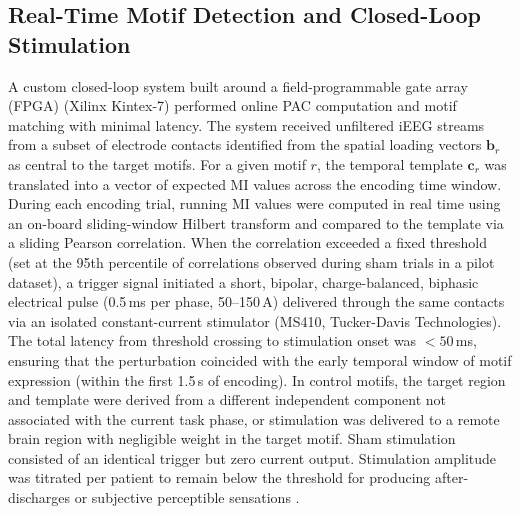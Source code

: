 \documentclass{article}
\begin{document}
\subsection{Real-Time Motif Detection and Closed-Loop Stimulation}
A custom closed-loop system built around a field-programmable gate array (FPGA) (Xilinx Kintex-7) performed online PAC computation and motif matching with minimal latency. The system received unfiltered iEEG streams from a subset of electrode contacts identified from the spatial loading vectors \(\mathbf{b}_r\) as central to the target motifs. For a given motif \(r\), the temporal template \(\mathbf{c}_r\) was translated into a vector of expected MI values across the encoding time window. During each encoding trial, running MI values were computed in real time using an on-board sliding-window Hilbert transform and compared to the template via a sliding Pearson correlation. When the correlation exceeded a fixed threshold (set at the 95th percentile of correlations observed during sham trials in a pilot dataset), a trigger signal initiated a short, bipolar, charge-balanced, biphasic electrical pulse (0.5\,ms per phase, 50--150\,\textmu{}A) delivered through the same contacts via an isolated constant-current stimulator (MS410, Tucker-Davis Technologies). The total latency from threshold crossing to stimulation onset was \(<50\)\,ms, ensuring that the perturbation coincided with the early temporal window of motif expression (within the first 1.5\,s of encoding). In control motifs, the target region and template were derived from a different independent component not associated with the current task phase, or stimulation was delivered to a remote brain region with negligible weight in the target motif. Sham stimulation consisted of an identical trigger but zero current output. Stimulation amplitude was titrated per patient to remain below the threshold for producing after-discharges or subjective perceptible sensations \cite{keller2018closed}.
\end{document}
